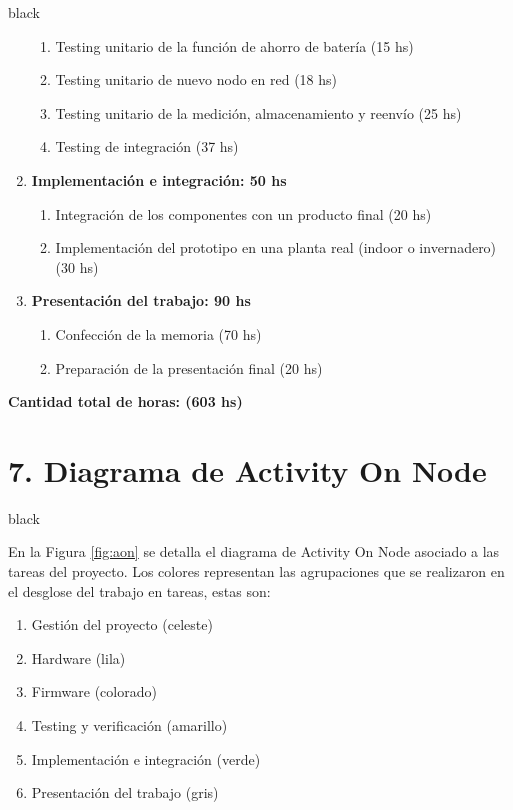 \documentclass[11pt]{charter}
\begin{document}
\begin{consigna}{black}
\begin{enumerate}
\begin{enumerate}
	\item Testing unitario de la función de ahorro de batería (15 hs)
	\item Testing unitario de nuevo nodo en red (18 hs)
	\item Testing unitario de la medición, almacenamiento y reenvío (25 hs)
	\item Testing de integración (37 hs)
	\end{enumerate}
\item \textbf{Implementación e integración: 50 hs}
	\begin{enumerate}
	\item Integración de los componentes con un producto final (20 hs)
	\item Implementación del prototipo en una planta real (indoor o invernadero) (30 hs)
	\end{enumerate}
\item \textbf{Presentación del trabajo: 90 hs}
	\begin{enumerate}
	\item Confección de la memoria (70 hs)
	\item Preparación de la presentación final (20 hs)
	\end{enumerate}
\end{enumerate}

\textbf{Cantidad total de horas: (603 hs)}


\end{consigna}

\section{7. Diagrama de Activity On Node}
\label{sec:AoN}

\begin{consigna}{black}

En la Figura \ref{fig:aon} se detalla el diagrama de Activity On Node asociado a las tareas del proyecto. Los colores representan las agrupaciones que se realizaron en el desglose del trabajo en tareas, estas son:

\begin{enumerate}
	\item Gestión del proyecto (celeste)
	\item Hardware (lila)
	\item Firmware (colorado)
	\item Testing y verificación (amarillo)
	\item Implementación e integración (verde)
	\item Presentación del trabajo (gris)
\end{enumerate}



\end{consigna}
\end{document}
